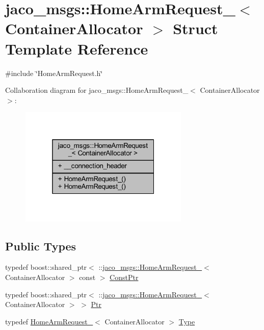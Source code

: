 \hypertarget{structjaco__msgs_1_1HomeArmRequest__}{}\section{jaco\+\_\+msgs\+:\+:Home\+Arm\+Request\+\_\+$<$ Container\+Allocator $>$ Struct Template Reference}
\label{structjaco__msgs_1_1HomeArmRequest__}


{\ttfamily \#include \char`\"{}Home\+Arm\+Request.\+h\char`\"{}}



Collaboration diagram for jaco\+\_\+msgs\+:\+:Home\+Arm\+Request\+\_\+$<$ Container\+Allocator $>$\+:
\nopagebreak
\begin{figure}[H]
\begin{center}
\leavevmode
\includegraphics[width=229pt]{d3/dc5/structjaco__msgs_1_1HomeArmRequest____coll__graph}
\end{center}
\end{figure}
\subsection*{Public Types}
\begin{DoxyCompactItemize}
\item 
typedef boost\+::shared\+\_\+ptr$<$ \+::\hyperlink{structjaco__msgs_1_1HomeArmRequest__}{jaco\+\_\+msgs\+::\+Home\+Arm\+Request\+\_\+}$<$ Container\+Allocator $>$ const  $>$ \hyperlink{structjaco__msgs_1_1HomeArmRequest___aeb08171e814003f8aee8c2417a98ad82}{Const\+Ptr}
\item 
typedef boost\+::shared\+\_\+ptr$<$ \+::\hyperlink{structjaco__msgs_1_1HomeArmRequest__}{jaco\+\_\+msgs\+::\+Home\+Arm\+Request\+\_\+}$<$ Container\+Allocator $>$ $>$ \hyperlink{structjaco__msgs_1_1HomeArmRequest___a6f1a3bb1fb5ae30cd261066de64a51a7}{Ptr}
\item 
typedef \hyperlink{structjaco__msgs_1_1HomeArmRequest__}{Home\+Arm\+Request\+\_\+}$<$ Container\+Allocator $>$ \hyperlink{structjaco__msgs_1_1HomeArmRequest___a545fb813c289658b39f0a61c422c76b5}{Type}
\end{DoxyCompactItemize}
